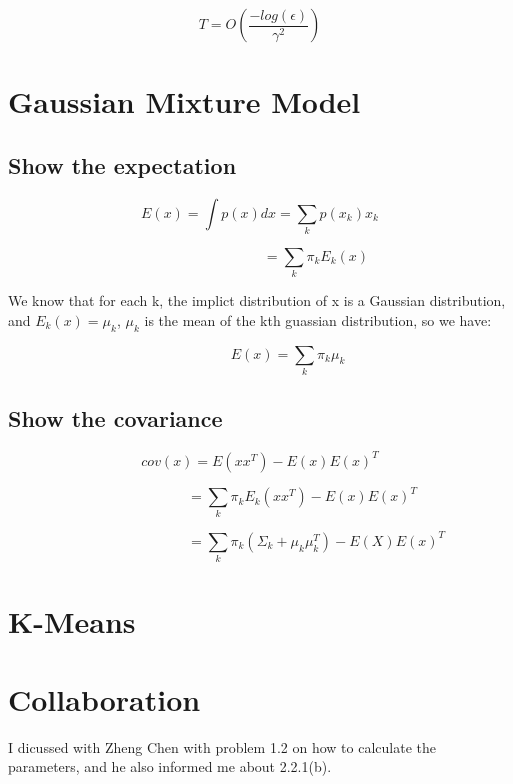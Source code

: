 \documentclass{article} %
\begin{document}
\begin{equation}
T = O (\frac{-log (\epsilon)}{\gamma^2})
\end{equation}


\section{Gaussian Mixture Model}


\subsection{Show the expectation}
\begin{equation}
E (x) = \int p(x) dx = \sum_k p(x_k) x_k
\end{equation}

\begin{equation}
\qquad \qquad \qquad \qquad
= \sum_k \pi_k E_k (x)
\end{equation}

We know that for each k, the implict distribution of x is a Gaussian
distribution, and $E_k (x) = \mu_k$, $\mu_k$ is the mean of the kth guassian
distribution, so we have:

\begin{equation}
\qquad \qquad
E (x) = \sum_k \pi_k \mu_k
\end{equation}


\subsection{Show the covariance}
\begin{equation}
cov (x) = E (x x^T) - E (x) E(x)^T
\end{equation}

\begin{equation}
\qquad \qquad \qquad
= \sum_k \pi_k E_k (x x^T) - E (x) E(x)^T
\end{equation}

\begin{equation}
\qquad \qquad \qquad \qquad
= \sum_k \pi_k (\Sigma_k + \mu_k \mu_k^T) - E (X) E (x)^T
\end{equation}







\section{K-Means}

\section{Collaboration}
I dicussed with Zheng Chen with problem 1.2 on how to calculate the parameters,
and he also informed me about 2.2.1(b).
\end{document}
